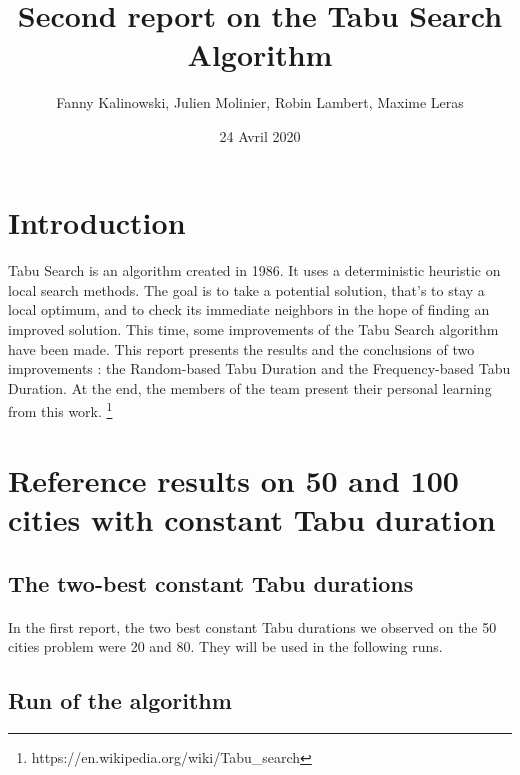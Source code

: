 \documentclass[12pt,oneside,a4paper]{article}
\begin{document}
\title{Second report on the Tabu Search Algorithm}
\author{Fanny Kalinowski, Julien Molinier, Robin Lambert, Maxime Leras}
\date{24 Avril 2020}
\maketitle\thispagestyle{empty}

\newpage    
\clearpage
\thispagestyle{empty}
\renewcommand*\contentsname{Sommaire}
\tableofcontents
\newpage

\pagestyle{fancy}
\cfoot{\thepage}
\fancyhead{}
\fancyhead[R]{\leftmark}

\section{Introduction}
\paragraph{}
    Tabu Search is an algorithm created in 1986. It uses a deterministic heuristic on
    local search methods. The goal is to take a potential solution, that's to stay a local optimum,  
    and to check its immediate neighbors in the hope of finding an improved solution.
    This time, some improvements of the Tabu Search algorithm have been made.
    This report presents the results and the conclusions of two improvements :  the Random-based Tabu Duration and the Frequency-based Tabu Duration.
    At the end, the members of the team present their personal learning from this work. 
    \footnote{https://en.wikipedia.org/wiki/Tabu\_search}

\section{Reference results on 50 and 100 cities with constant Tabu duration}
\subsection{The two-best constant Tabu durations}
\paragraph{}
In the first report, the two best constant Tabu durations we observed on the 50 cities problem were 20 and 80.
They will be used in the following runs.
\subsection{Run of the algorithm}
\end{document}
